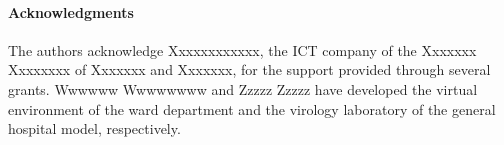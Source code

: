 \paragraph*{Acknowledgments}



The authors acknowledge Xxxxxxxxxxxx, the ICT company of the Xxxxxxx Xxxxxxxx of Xxxxxxx and Xxxxxxx, for the support provided through several grants. Wwwwww Wwwwwwww and Zzzzz Zzzzz have developed the virtual environment of the ward department and the virology laboratory of the general hospital model, respectively.
